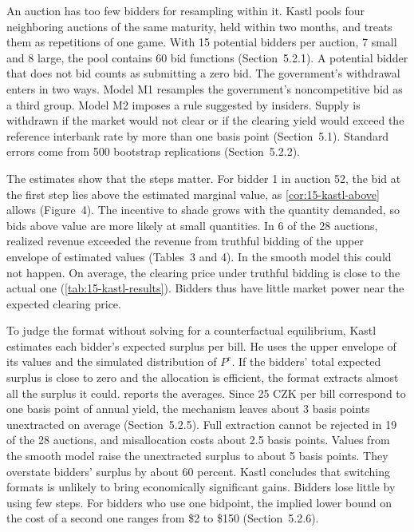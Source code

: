 An auction has too few bidders for resampling within it. Kastl pools four neighboring auctions of the same
maturity, held within two months, and treats them as repetitions of one game. With 15 potential bidders per
auction, 7 small and 8 large, the pool contains 60 bid functions (Section~5.2.1). A potential bidder that does
not bid counts as submitting a zero bid. The government's withdrawal enters in two ways. Model M1 resamples
the government's noncompetitive bid as a third group. Model M2 imposes a rule suggested by insiders. Supply is
withdrawn if the market would not clear or if the clearing yield would exceed the reference interbank rate by
more than one basis point (Section~5.1). Standard errors come from 500 bootstrap replications
(Section~5.2.2).

 The estimates show that the steps matter. For bidder 1 in auction 52, the bid at the first
step lies above the estimated marginal value, as \cref{cor:15-kastl-above} allows (Figure~4). The incentive to
shade grows with the quantity demanded, so bids above value are more likely at small quantities. In 6 of the
28 auctions, realized revenue exceeded the revenue from truthful bidding of the upper envelope of estimated
values (Tables~3 and 4). In the smooth model this could not happen. On average, the clearing price under
truthful bidding is close to the actual one (\cref{tab:15-kastl-results}). Bidders thus have little market power near
the expected clearing price.

To judge the format without solving for a counterfactual equilibrium, Kastl estimates each bidder's expected
surplus per bill. He uses the upper envelope of its values and the simulated distribution of $P^{\mathrm c}$.
If the bidders' total expected surplus is close to zero and the allocation is efficient, the format extracts
almost all the surplus it could.  reports the averages. Since 25 CZK per bill
correspond to one basis point of annual yield, the mechanism leaves about 3 basis points unextracted on
average (Section~5.2.5). Full extraction cannot be rejected in 19 of the 28 auctions, and misallocation costs
about 2.5 basis points. Values from the smooth model raise the unextracted surplus to about 5 basis points.
They overstate bidders' surplus by about 60 percent. Kastl concludes that switching formats is unlikely to
bring economically significant gains. Bidders lose little by using few steps. For bidders who use one
bidpoint, the implied lower bound on the cost of a second one ranges from \$2 to \$150 (Section~5.2.6).

